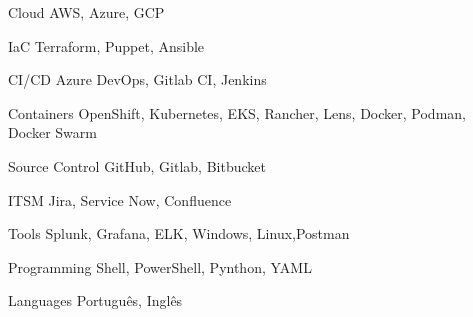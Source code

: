 

\begin{cvskills}

  \cvskill
    {Cloud} %
    {AWS, Azure, GCP} %

  \cvskill
    {IaC} %
    {Terraform, Puppet, Ansible} %

  \cvskill
    {CI/CD} %
    {Azure DevOps, Gitlab CI, Jenkins} %

  \cvskill
    {Containers} %
    {OpenShift, Kubernetes, EKS, Rancher, Lens, Docker, Podman, Docker Swarm} %

  \cvskill
    {Source Control} %
    {GitHub, Gitlab, Bitbucket} %

  \cvskill
    {ITSM} %
    {Jira, Service Now, Confluence} %

  \cvskill
    {Tools} %
    {Splunk, Grafana, ELK, Windows, Linux,Postman} %

  \cvskill
    {Programming} %
    {Shell, PowerShell, Pynthon, YAML} %

  \cvskill
    {Languages} %
    {Português, Inglês} %

\end{cvskills}